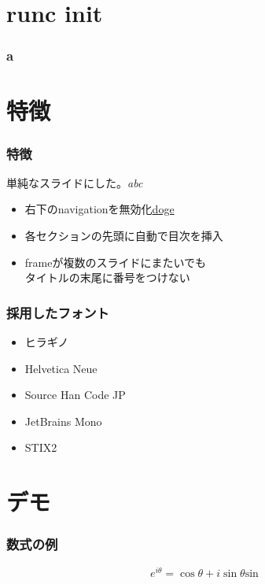 \documentclass[unicode, 14pt, aspectratio=169]{beamer}
\begin{document}
\section{runc init}
\begin{frame}[t]
  \frametitle{a}
\end{frame}
\section{特徴}
\begin{frame}[t]
  \frametitle{特徴}
    単純なスライドにした。\textit{abc}
  \vspace{0.2\paperheight}
  \begin{itemize}
    \item 右下のnavigationを無効化\href{https://google.com}{doge}
    \item 各セクションの先頭に自動で目次を挿入
    \item frameが複数のスライドにまたいでも\\タイトルの末尾に番号をつけない
  \end{itemize}
\end{frame}


\begin{frame}
\frametitle{採用したフォント}
\begin{itemize}
\item ヒラギノ
\item Helvetica Neue
\item Source Han Code JP
\item JetBrains Mono
\item STIX2
\end{itemize}
\end{frame}

\section{デモ}

\begin{frame}
  \frametitle{数式の例}
  \begin{equation}
    e^{i\theta} = \cos\theta + i\sin \theta \mathrm{sin}
  \end{equation}
\end{frame}
\end{document}
